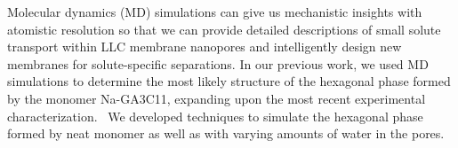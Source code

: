 \documentclass[journal=jpcbfk,manuscript=article]{achemso}
\begin{document}

  Molecular dynamics (MD) simulations can give us mechanistic insights with
  atomistic resolution so that we can provide detailed descriptions of small
  solute transport within LLC membrane nanopores and intelligently design new
  membranes for solute-specific separations. In our previous work, we used MD
  simulations to determine the most likely structure of the hexagonal phase
  formed by the monomer Na-GA3C11, expanding upon the most recent experimental
  characterization.~\cite{coscia_understanding_2019,feng_thin_2016} We developed
  techniques to simulate the hexagonal phase formed by neat monomer as well as
  with varying amounts of water in the pores.
 
\end{document}
